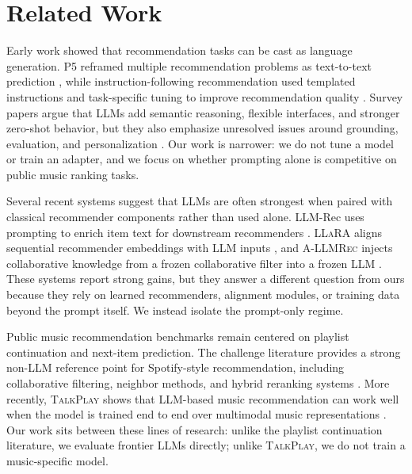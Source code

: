\section{Related Work}
\label{sec:related}

 Early work showed that recommendation tasks can be cast as language generation. P5 reframed multiple recommendation problems as text-to-text prediction \cite{geng2022p5}, while instruction-following recommendation used templated instructions and task-specific tuning to improve recommendation quality \cite{zhang2023instruction}. Survey papers argue that LLMs add semantic reasoning, flexible interfaces, and stronger zero-shot behavior, but they also emphasize unresolved issues around grounding, evaluation, and personalization \cite{wu2023survey,zhao2023era}. Our work is narrower: we do not tune a model or train an adapter, and we focus on whether prompting alone is competitive on public music ranking tasks.

 Several recent systems suggest that LLMs are often strongest when paired with classical recommender components rather than used alone. LLM-Rec uses prompting to enrich item text for downstream recommenders \cite{lyu2023llmrec}. \textsc{LLaRA} aligns sequential recommender embeddings with LLM inputs \cite{liao2024llara}, and \textsc{A-LLMRec} injects collaborative knowledge from a frozen collaborative filter into a frozen LLM \cite{kim2024allmrec}. These systems report strong gains, but they answer a different question from ours because they rely on learned recommenders, alignment modules, or training data beyond the prompt itself. We instead isolate the prompt-only regime.

 Public music recommendation benchmarks remain centered on playlist continuation and next-item prediction. The \mpd challenge literature provides a strong non-LLM reference point for Spotify-style recommendation, including collaborative filtering, neighbor methods, and hybrid reranking systems \cite{teinemaa2018playlist,zamani2018analysis}. More recently, \textsc{TalkPlay} shows that LLM-based music recommendation can work well when the model is trained end to end over multimodal music representations \cite{doh2025talkplay}. Our work sits between these lines of research: unlike the playlist continuation literature, we evaluate frontier LLMs directly; unlike \textsc{TalkPlay}, we do not train a music-specific model.

